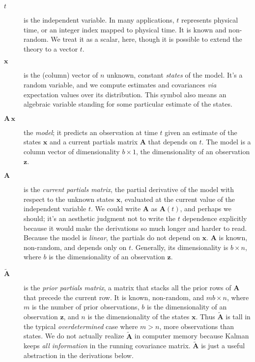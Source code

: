 \documentclass[10pt,oneside,x11names]{article}
\begin{document}
\begin{description}
\item[{\(t\)}] is the independent variable. In many applications, \(t\) represents physical
time, or an integer index mapped to physical time. It is known and
non-random. We treat it as a scalar, here, though it is possible to extend
the theory to a vector \(t\).

\item[{\(\mathbold{x}\)}] is the (column) vector of \(n\) unknown, constant \emph{states}
of the model. It's a random variable, and we compute estimates and
covariances \emph{via} expectation values over its distribution. This symbol
also means an algebraic variable standing for some particular estimate of
the states.

\item[{\(\mathbold{A}\,\mathbold{x}\)}] the \emph{model}; it predicts an observation at
time \(t\) given an estimate of the states \(\mathbold{x}\) and a current
partials matrix \(\mathbold{A}\) that depends on \(t\). The model is a
column vector of dimensionality \(b\times{1}\), the dimensionality of an
observation \(\mathbold{z}\).

\item[{\(\mathbold{A}\)}] is the \emph{current partials matrix}, the partial derivative of
the model with respect to the unknown states \(\mathbold{x}\), evaluated
at the current value of the independent variable \(t\). We could write
\(\mathbold{A}\) as \(\mathbold{A}(t)\), and perhaps we should; it's an
aesthetic judgment not to write the \(t\) dependence explicitly because it
would make the derivations so much longer and harder to read.  Because the
model is \emph{linear}, the partials do not depend on \(\mathbold{x}\). 
\(\mathbold{A}\) is known, non-random, and depends only on \(t\). Generally,
its dimensionality
is \(b\times{n}\), where \(b\) is the dimensionality of an 
observation \(\mathbold{z}\).

\item[{\(\tilde{\mathbold{A}}\)}] is the \emph{prior partials matrix}, a matrix that stacks
all the prior rows of \(\mathbold{A}\) that precede the current row. It is
known, non-random, and \(m b\times{n}\), where \(m\) is the number of prior
observations, \(b\) is the dimensionality of an 
observation \(\mathbold{z}\), and \(n\) is the dimensionality of the states
\(\mathbold{x}\).  Thus
\(\tilde{\mathbold{A}}\) is tall in the typical \emph{overdetermined} case where
\(m>n\), more observations than states. We do not actually
realize \(\tilde{\mathbold{A}}\) in computer memory because Kalman keeps
\emph{all information} in the running covariance matrix. \(\tilde{\mathbold{A}}\)
is just a
useful abstraction in the derivations below.


\end{description}
\end{document}
